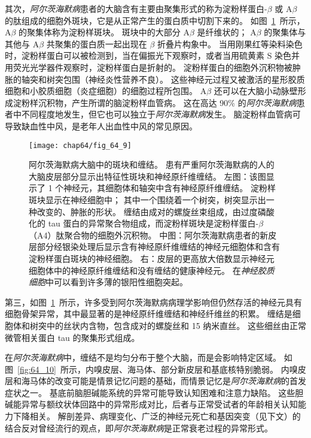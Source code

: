其次，\textit{阿尔茨海默病}患者的大脑含有主要由聚集形式的称为淀粉样蛋白-$\beta$ 或 A$\beta$ 的肽组成的细胞外斑块，它是从正常产生的蛋白质中切割下来的。
如图~\ref{fig:64_9}~所示，A$\beta$ 的聚集体称为淀粉样斑块。
斑块中的大部分 A$\beta$ 是纤维状的；
A$\beta$ 的聚集体与其他与 A$\beta$ 共聚集的蛋白质一起出现在 $\beta$ 折叠片构象中。
当用刚果红等染料染色时，淀粉样蛋白可以被检测到，当在偏振光下观察时，或者当用硫黄素 S 染色并用荧光光学器件观察时，淀粉样蛋白是折射的。
淀粉样蛋白的细胞外沉积物被肿胀的轴突和树突包围（神经炎性营养不良）。
这些神经元过程又被激活的星形胶质细胞和小胶质细胞（炎症细胞）的细胞过程所包围。
A$\beta$ 还可以在大脑小动脉壁形成淀粉样沉积物，产生所谓的脑淀粉样血管病。
这在高达 90\% 的\textit{阿尔茨海默病}患者中不同程度地发生，但它也可以独立于\textit{阿尔茨海默病}发生。
脑淀粉样血管病可导致缺血性中风，是老年人出血性中风的常见原因。


\begin{figure}[htbp]
	\centering
	\texttt{[image: chap64/fig\_64\_9]}
	\caption{阿尔茨海默病大脑中的斑块和缠结。
		患有严重阿尔茨海默病的人的大脑皮层部分显示出特征性斑块和神经原纤维缠结。
		左图：该图显示了 1 个神经元，其细胞体和轴突中含有神经原纤维缠结。
		淀粉样斑块显示在神经细胞中；
		其中一个围绕着一个树突，树突显示出一种改变的、肿胀的形状。
		缠结由成对的螺旋丝束组成，由过度磷酸化的 tau 蛋白的异常聚合物组成，而淀粉样斑块是淀粉样蛋白-$\beta$（A4）肽聚合物的细胞外沉积物。
		中图：阿尔茨海默病患者的新皮层部分经银染处理后显示含有神经原纤维缠结的神经元细胞体和含有淀粉样蛋白斑块的神经细胞。
		右：皮层的更高放大倍数显示神经元细胞体中的神经原纤维缠结和没有缠结的健康神经元。
		在\textit{神经胶质细胞}中可以看到许多薄的银阳性细胞突起。}
	\label{fig:64_9}
\end{figure}


第三，如图~\ref{fig:64_9}~所示，许多受到阿尔茨海默病病理学影响但仍然存活的神经元具有细胞骨架异常，其中最显著的是神经原纤维缠结和神经纤维丝的积累。
缠结是细胞体和树突中的丝状内含物，包含成对的螺旋丝和 15 纳米直丝。
这些细丝由正常微管相关蛋白 tau 的聚集形式组成。


在\textit{阿尔茨海默病}中，缠结不是均匀分布于整个大脑，而是会影响特定区域。
如图~\ref{fig:64_10}~所示，内嗅皮层、海马体、部分新皮层和基底核特别脆弱。
内嗅皮层和海马体的改变可能是情景记忆问题的基础，而情景记忆是\textit{阿尔茨海默病}的首发症状之一。
基底前脑胆碱能系统的异常可能导致认知困难和注意力缺陷。
这些胆碱能异常与额纹状体回路中的异常形成对比，后者与正常受试者的年龄相关认知能力下降相关。
解剖差异、病理变化、广泛的神经元死亡和基因突变（见下文）的结合反对曾经流行的观点，即\textit{阿尔茨海默病}是正常衰老过程的异常形式。


